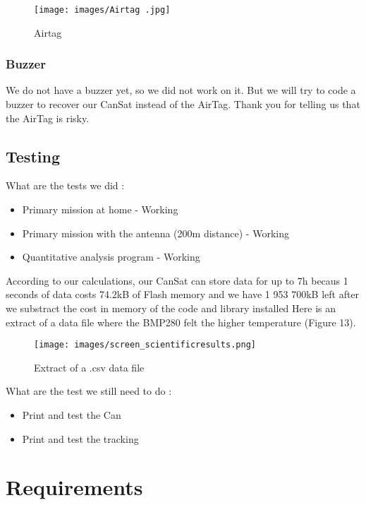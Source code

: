 \documentclass[]{article}
\begin{document}
\begin{figure}[h] 
    \centering
    \texttt{[image: images/Airtag .jpg]} 
    \caption{Airtag}
\end{figure}

\subsubsection{Buzzer}

We do not have a buzzer yet, so we did not work on it. But we will try to code a buzzer
to recover our CanSat instead of the AirTag. Thank you for telling us that the AirTag is risky.

\subsection{Testing}

What are the tests we did :
\begin{itemize}
    \item Primary mission at home - Working
    \item Primary mission with the antenna (200m distance) - Working
    \item Quantitative analysis program - Working 
\end{itemize}

According to our calculations, our CanSat can store data for up to 7h becaus 1 seconds of data costs 74.2kB of Flash memory
and we have 1 953 700kB left after we substract the cost in memory of the code and library installed Here is an extract of 
a data file where the BMP280 felt the higher temperature (Figure 13).

\begin{figure}[h] 
    \centering
    \texttt{[image: images/screen\_scientificresults.png]} 
    \caption{Extract of a .csv data file}
\end{figure}

What are the test we still need to do :
\begin{itemize}
    \item Print and test the Can 
    \item Print and test the tracking
\end{itemize}


\section{Requirements}
\end{document}
